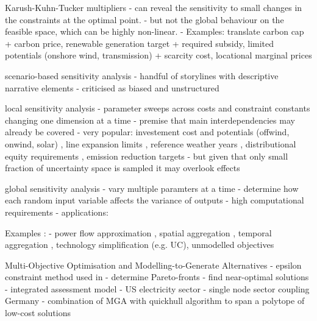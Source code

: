 Karush-Kuhn-Tucker multipliers
- can reveal the sensitivity to small changes in the constraints at the optimal point.
- but not the global behaviour on the feasible space, which can be highly non-linear.
- Examples: translate carbon cap + carbon price, renewable generation target + required subsidy, limited potentials (onshore wind, transmission) + scarcity cost, locational marginal prices
    
scenario-based sensitivity analysis
- handful of storylines with descriptive narrative elements \cite{DeCarolis2017,soroudi_decision_2013}
- criticised as biased and unstructured \cite{usher_value_2015}

local sensitivity analysis
- parameter sweeps across costs and constraint constants changing one dimension at a time \cite{schlachtberger_cost_2018}
- premise that main interdependencies may already be covered \cite{schlachtberger_cost_2018}
- very popular: investement cost and potentials (offwind, onwind, solar) \cite{schlachtberger_cost_2018}, line expansion limits \cite{schlachtberger_benefits_2017}, reference weather years \cite{bloomfield_2021}, distributional equity requirements \cite{sasse_regional_2020,sasse_distributional_2019}, emission reduction targets
- but given that only small fraction of uncertainty space is sampled it may overlook effects \cite{pizarro-alonso_uncertainties_2019}

global sensitivity analysis
- vary multiple paramters at a time
- determine how each random input variable affects the variance of outputs \cite{sudret_global_2008}
- high computational requirements \cite{usher_value_2015,pizarro-alonso_uncertainties_2019,moret_robust_2016}
- applications: \cite{trondle_trade-offs_2020,fais_impact_2016,mavromatidis_uncertainty_2018,pilpola_analyzing_2020}


Examples \cite{DeCarolis2017}:
- power flow approximation \cite{flowandlosses}, spatial aggregation \cite{hoersch_spatial_2017}, temporal aggregation \cite{kotzur_tsa_2018}, technology simplification (e.g. UC), unmodelled objectives

Multi-Objective Optimisation and Modelling-to-Generate Alternatives
- epsilon constraint method used in \cite{nearoptimal}
- determine Pareto-fronts \cite{mavrotas_effective_2009}
- find near-optimal solutions
- \cite{Price2017} integrated assessment model
- \cite{DeCarolis2016} US electricity sector
- \cite{nacken_integrated_2019} single node sector coupling Germany
- \cite{pedersen_modeling_2020} combination of MGA with quickhull algorithm to span a polytope of low-cost solutions

